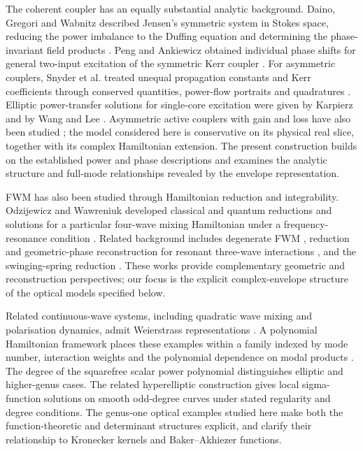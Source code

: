 \documentclass[11pt,a4paper]{article}
\numberwithin{equation}{section}
\begin{document}
The coherent coupler has an equally substantial analytic background.
Daino, Gregori and Wabnitz described Jensen's symmetric system in Stokes space, reducing the power imbalance to the Duffing equation and determining the phase-invariant field products \cite{dainoStabilityAnalysisNonlinear1985}.
Peng and Ankiewicz obtained individual phase shifts for general two-input excitation of the symmetric Kerr coupler \cite{pengIntensitydependentPhaseShifts1990}.
For asymmetric couplers, Snyder et al. treated unequal propagation constants and Kerr coefficients through conserved quantities, power-flow portraits and quadratures \cite{snyderPhysicsNonlinearFiber1991}.
Elliptic power-transfer solutions for single-core excitation were given by Karpierz \cite{karpierzNonlinearDirectionalCouplers1992} and by Wang and Lee \cite{wangEffectsLinearMismatch2001}.
Asymmetric active couplers with gain and loss have also been studied \cite{kominisAsymmetricActiveCoupler2016}; the model considered here is conservative on its physical real slice, together with its complex Hamiltonian extension.
The present construction builds on the established power and phase descriptions and examines the analytic structure and full-mode relationships revealed by the envelope representation.

FWM has also been studied through Hamiltonian reduction and integrability.
Odzijewicz and Wawreniuk developed classical and quantum reductions and solutions for a particular four-wave mixing Hamiltonian under a frequency-resonance condition \cite{odzijewiczIntegrableClassicalQuantum2020}.
Related background includes degenerate FWM \cite{cappelliniThirdorderThreewaveMixing1991}, reduction and geometric-phase reconstruction for resonant three-wave interactions \cite{alberGeometricPhasesReduction1998}, and the swinging-spring reduction \cite{holmStepwisePrecessionResonant2002}.
These works provide complementary geometric and reconstruction perspectives; our focus is the explicit complex-envelope structure of the optical models specified below.

Related continuous-wave systems, including quadratic wave mixing and polarisation dynamics, admit Weierstrass representations \cite{heskethGeneralComplexEnvelope2015}.
A polynomial Hamiltonian framework places these examples within a family indexed by mode number, interaction weights and the polynomial dependence on modal products \cite[Section~4]{heskethGeneratingIntegrableSystems2026}.
The degree of the squarefree scalar power polynomial distinguishes elliptic and higher-genus cases.
The related hyperelliptic construction \cite{zotero-item-855} gives local sigma-function solutions on smooth odd-degree curves under stated regularity and degree conditions.
The genus-one optical examples studied here make both the function-theoretic and determinant structures explicit, and clarify their relationship to Kronecker kernels and Baker--Akhiezer functions.
\end{document}
